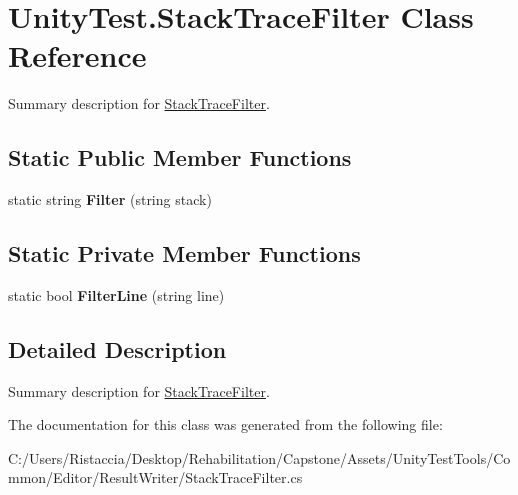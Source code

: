 \hypertarget{class_unity_test_1_1_stack_trace_filter}{}\section{Unity\+Test.\+Stack\+Trace\+Filter Class Reference}
\label{class_unity_test_1_1_stack_trace_filter}


Summary description for \hyperlink{class_unity_test_1_1_stack_trace_filter}{Stack\+Trace\+Filter}.  


\subsection*{Static Public Member Functions}
\begin{DoxyCompactItemize}
\item 
\mbox{\label{class_unity_test_1_1_stack_trace_filter_a8cd299c963244f5c860e7faea3ccdc65}} 
static string {\bfseries Filter} (string stack)
\end{DoxyCompactItemize}
\subsection*{Static Private Member Functions}
\begin{DoxyCompactItemize}
\item 
\mbox{\label{class_unity_test_1_1_stack_trace_filter_abc53c0e95232819c60470821fb9700d2}} 
static bool {\bfseries Filter\+Line} (string line)
\end{DoxyCompactItemize}


\subsection{Detailed Description}
Summary description for \hyperlink{class_unity_test_1_1_stack_trace_filter}{Stack\+Trace\+Filter}. 



The documentation for this class was generated from the following file\+:\begin{DoxyCompactItemize}
\item 
C\+:/\+Users/\+Ristaccia/\+Desktop/\+Rehabilitation/\+Capstone/\+Assets/\+Unity\+Test\+Tools/\+Common/\+Editor/\+Result\+Writer/Stack\+Trace\+Filter.\+cs\end{DoxyCompactItemize}

